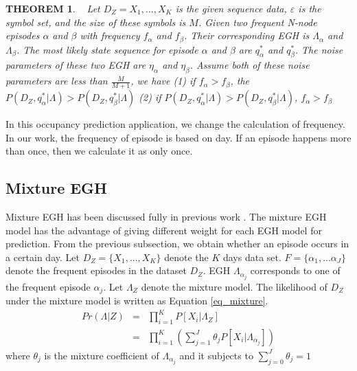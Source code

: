 \newtheorem{mydef}{THEOREM}
\begin{mydef}
\label{theorem1}~\cite{laxman2005discovering} 
Let $D_Z={X_1,..., X_K}$ is the given sequence data,  $\varepsilon$ is the symbol set, 
and the size of these symbols is $M$. 
Given two frequent N-node episodes $\alpha$ and $\beta$ with frequency $f_{\alpha}$ 
and $f_{\beta}$. Their corresponding EGH is $\Lambda_{\alpha}$ and $\Lambda_{\beta}$. 
The most likely state sequence for episode $\alpha$ and $\beta$ are
$q_{\alpha}^*$ and $q_{\beta}^*$. 
The noise parameters of these two EGH are 
$\eta_{\alpha}$ and $\eta_{\beta}$. 
Assume both of these noise parameters are less than $\frac{M}{M+1}$, 
we have 
(1) if $f_{\alpha} > f_{\beta}$, the $P(D_Z, q_{\alpha}^*| \Lambda) > P(D_Z, q_{\beta}^*| \Lambda)  $
(2) if $P(D_Z, q_{\alpha}^*| \Lambda) > P(D_Z, q_{\beta}^*| \Lambda)  $, $f_{\alpha} > f_{\beta}$
\end{mydef}

In this occupancy prediction application, 
we change the calculation of frequency. 
In our work, the frequency of episode 
is based on day. 
If an episode happens more than once, 
then we calculate it as only once. 

\subsection{Mixture EGH}
Mixture EGH has been discussed fully in previous work \cite{laxman2005discovering}.
The mixture EGH model has the advantage of 
giving different weight for each EGH model
for prediction. 
From the previous subsection, 
we obtain whether an episode occurs in a certain day. 
Let $D_Z=\{X_1,..., X_K\}$ denote the $K$ days data set. 
$F=\{\alpha_1, ... \alpha_J\}$ denote the frequent episodes in the dataset $D_Z$. 
EGH $\Lambda_{\alpha_j}$ 
corresponds to 
one of the frequent episode $\alpha_j$.
Let $\Lambda_Z$ denote the mixture model. 
The likelihood of $D_Z$ under the mixture model is written as Equation \ref{eq_mixture}.
\begin{eqnarray}
\label{eq_mixture}
Pr(\Lambda|Z) &=& \prod_{i=1}^K P[X_i|\Lambda_Z] \\
			&=& \prod_{i=1}^K ( \sum_{j=1}^J \theta_j P[X_i| \Lambda_{\alpha_j}])
\end{eqnarray}
where $\theta_j$ is the mixture coefficient of $\Lambda_{\alpha_j}$ and it subjects to 
$\sum_{j=0}^J \theta_j=1$ 

